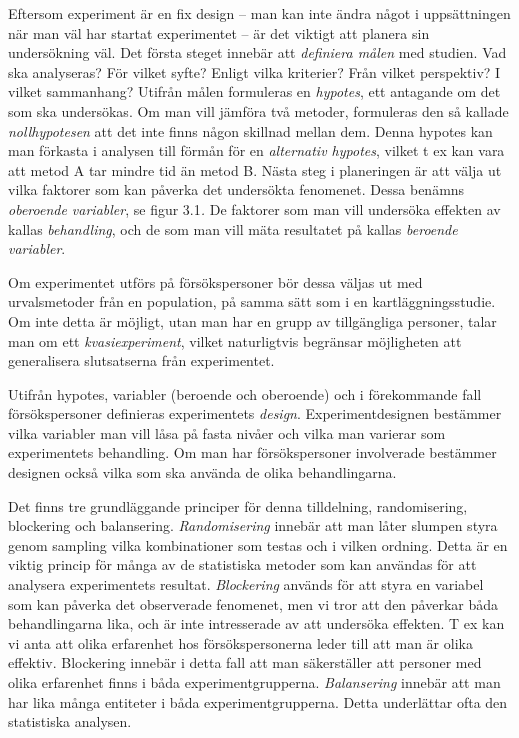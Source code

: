 Eftersom experiment är en fix design -- man kan inte ändra något i
uppsättningen när man väl har startat experimentet -- är det viktigt att
planera sin undersökning väl. Det första steget innebär att
\emph{definiera målen} med studien. Vad ska analyseras? För vilket
syfte? Enligt vilka kriterier? Från vilket perspektiv? I vilket
sammanhang? Utifrån målen formuleras en \emph{hypotes}, ett antagande om
det som ska undersökas. Om man vill jämföra två metoder, formuleras den
så kallade \emph{nollhypotesen} att det inte finns någon skillnad mellan
dem. Denna hypotes kan man förkasta i analysen till förmån för en
\emph{alternativ hypotes}, vilket t ex kan vara att metod A tar mindre
tid än metod B. Nästa steg i planeringen är att välja ut vilka faktorer
som kan påverka det undersökta fenomenet. Dessa benämns \emph{oberoende
variabler}, se figur 3.1\emph{.} De faktorer som man vill undersöka
effekten av kallas \emph{behandling}, och de som man vill mäta
resultatet på kallas \emph{beroende variabler}.

Om experimentet utförs på försökspersoner bör dessa väljas ut med
urvalsmetoder från en population, på samma sätt som i en
kartläggningsstudie. Om inte detta är möjligt, utan man har en grupp av
tillgängliga personer, talar man om ett \emph{kvasiexperiment}, vilket
naturligtvis begränsar möjligheten att generalisera slutsatserna från
experimentet.

Utifrån hypotes, variabler (beroende och oberoende) och i förekommande
fall försökspersoner definieras experimentets \emph{design}.
Experimentdesignen bestämmer vilka variabler man vill låsa på fasta
nivåer och vilka man varierar som experimentets behandling. Om man har
försökspersoner involverade bestämmer designen också vilka som ska
använda de olika behandlingarna.

Det finns tre grundläggande principer för denna tilldelning,
randomisering, blockering och balansering. \emph{Randomisering} innebär
att man låter slumpen styra genom sampling vilka kombinationer som
testas och i vilken ordning. Detta är en viktig princip för många av de
statistiska metoder som kan användas för att analysera experimentets
resultat. \emph{Blockering} används för att styra en variabel som kan
påverka det observerade fenomenet, men vi tror att den påverkar båda
behandlingarna lika, och är inte intresserade av att undersöka effekten.
T ex kan vi anta att olika erfarenhet hos försökspersonerna leder till
att man är olika effektiv. Blockering innebär i detta fall att man
säkerställer att personer med olika erfarenhet finns i båda
experimentgrupperna. \emph{Balansering} innebär att man har lika många
entiteter i båda experimentgrupperna. Detta underlättar ofta den
statistiska analysen.

